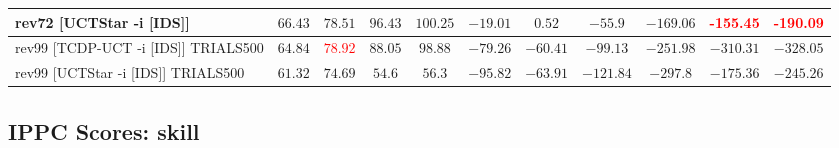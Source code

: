 \documentclass{article}
\begin{document}
\begin{tabular}{|l|r@{$\pm$}rr@{$\pm$}rr@{$\pm$}rr@{$\pm$}rr@{$\pm$}rr@{$\pm$}rr@{$\pm$}rr@{$\pm$}rr@{$\pm$}rr@{$\pm$}r|}
\\
rev72 [UCTStar -i [IDS]]
& \multicolumn{2}{c}{$66.43$}
& \multicolumn{2}{c}{$78.51$}
& \multicolumn{2}{c}{$96.43$}
& \multicolumn{2}{c}{$100.25$}
& \multicolumn{2}{c}{$-19.01$}
& \multicolumn{2}{c}{$0.52$}
& \multicolumn{2}{c}{$-55.9$}
& \multicolumn{2}{c}{$-169.06$}
& \multicolumn{2}{c}{\textbf{\textcolor{red}{-155.45}}}
& \multicolumn{2}{c|}{\textbf{\textcolor{red}{-190.09}}}
\\
\hline
rev99 [TCDP-UCT -i [IDS]] TRIALS500
& \multicolumn{2}{c}{$64.84$}
& \multicolumn{2}{c}{\textbf{\textcolor{red}{$78.92$}}}
& \multicolumn{2}{c}{$88.05$}
& \multicolumn{2}{c}{\textbf{$98.88$}}
& \multicolumn{2}{c}{$-79.26$}
& \multicolumn{2}{c}{$-60.41$}
& \multicolumn{2}{c}{$-99.13$}
& \multicolumn{2}{c}{$-251.98$}
& \multicolumn{2}{c}{$-310.31$}
& \multicolumn{2}{c|}{$-328.05$}
\\
rev99 [UCTStar -i [IDS]] TRIALS500
& \multicolumn{2}{c}{$61.32$}
& \multicolumn{2}{c}{$74.69$}
& \multicolumn{2}{c}{$54.6$}
& \multicolumn{2}{c}{$56.3$}
& \multicolumn{2}{c}{$-95.82$}
& \multicolumn{2}{c}{$-63.91$}
& \multicolumn{2}{c}{$-121.84$}
& \multicolumn{2}{c}{$-297.8$}
& \multicolumn{2}{c}{$-175.36$}
& \multicolumn{2}{c|}{$-245.26$}
\\
\hline
\end{tabular}%

\bigskip

\subsection*{IPPC Scores: skill}
\end{document}
